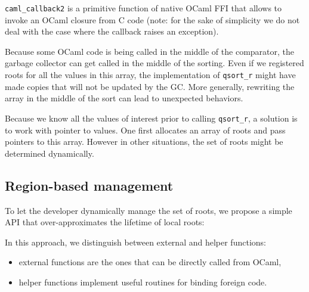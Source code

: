 \documentclass[a4paper]{easychair}
\begin{document}
\texttt{caml\_callback2} is a primitive function of native OCaml FFI
that allows to invoke an OCaml closure from C code (note: for the sake
of simplicity we do not deal with the case where the callback raises an
exception).

Because some OCaml code is being called in the middle of the comparator,
the garbage collector can get called in the middle of the sorting. Even
if we registered roots for all the values in this array, the
implementation of \texttt{qsort\_r} might have made copies that will not
be updated by the GC. More generally, rewriting the array in the middle
of the sort can lead to unexpected behaviors.

Because we know all the values of interest prior to calling
\texttt{qsort\_r}, a solution is to work with pointer to values. One
first allocates an array of roots and pass pointers to this array.
However in other situations, the set of roots might be determined
dynamically.

\hypertarget{region-based-management}{%
\subsection{Region-based management}\label{region-based-management}}

To let the developer dynamically manage the set of roots, we propose a
simple API that over-approximates the lifetime of local roots:

\begin{Shaded}
\begin{Highlighting}[]
 
\NormalTok{);}
\end{Highlighting}
\end{Shaded}

In this approach, we distinguish between external and helper functions:

\begin{itemize}
\tightlist
\item
  external functions are the ones that can be directly called from
  OCaml,
\item
  helper functions implement useful routines for binding foreign code.
\end{itemize}
\end{document}
